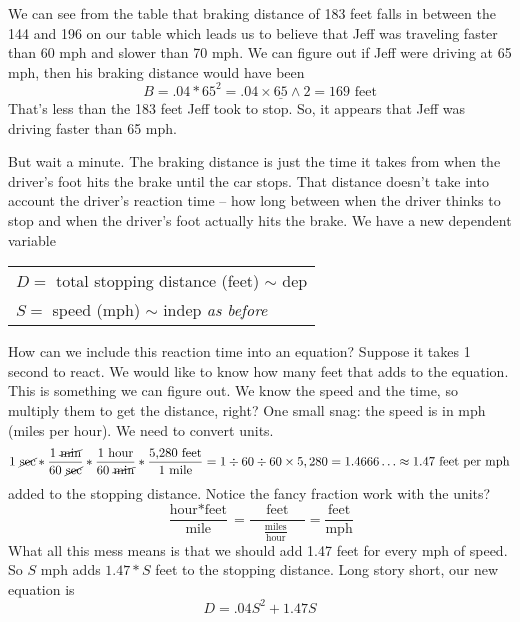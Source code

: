 We can see from the table that braking distance of 183 feet falls in between the 144 and 196 on our table which leads us to believe that Jeff was traveling faster than 60 mph and slower than 70 mph.  We can figure out if Jeff were driving at 65 mph, then his braking distance would have been 
$$B = .04 \ast 65^2 = .04\times \underline{65} \wedge 2 = 169 \text{ feet}$$  That's less than the 183 feet Jeff took to stop.  So, it appears that Jeff was driving faster than 65 mph. 

But wait a minute.  The braking distance is just the time it takes from when the driver's foot hits the brake until the car stops.  That distance doesn't take into account the driver's reaction time -- how long between when the driver thinks to stop and when the driver's foot actually hits the brake.  We have a new dependent variable
\begin{center}
\begin{tabular} {l} 
$D=$ total stopping distance (feet) $\sim$ dep \\ 
$S=$ speed (mph) $\sim$ indep \quad \emph{as before}\\
\end{tabular}
\end{center}

How can we include this reaction time into an equation?  Suppose it takes 1 second to react.  We would like to know how many feet that adds to the equation.  This is something we can figure out.  We know the speed and the time, so multiply them to get the distance, right?  One small snag:  the speed is in mph (miles per hour).  We need to convert units.    
$$1 \text{ \cancel{sec}} \ast \frac{1 \text{ \cancel{min}}}{60 \text{ \cancel{sec}}} \ast \frac{1 \text{ hour}}{60 \text{ \cancel{min}}} \ast \frac{\text{5,280 feet}}{1 \text{ mile}}=1 \div 60 \div 60 \times 5,280= 1.4666\ldots \approx 1.47 \text{ feet per mph}$$
added to the stopping distance. 
Notice the fancy fraction work  with the units?
$$\frac{\text{hour}\ast \text{feet}}{\text{mile}}=\frac{\text{feet}}{\quad \frac{\text{miles}}{\text{hour}}\quad~}=\frac{\text{feet}}{\text{mph}}$$
What all this mess means is that we should add 1.47 feet for every mph of speed.  
So $S$ mph adds $1.47\ast S$ feet to the stopping distance.
 Long story short, our new equation is
 $$D=.04S^2+1.47S$$

